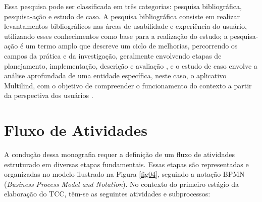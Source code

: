 Essa pesquisa pode ser classificada em três categorias: pesquisa bibliográfica, pesquisa-ação e estudo de caso. A pesquisa bibliográfica consiste em realizar levantamentos bibliográficos nas áreas de usabilidade e experiência do usuário, 
utilizando esses conhecimentos como base para a realização do estudo; a pesquisa-ação é um termo amplo que descreve um ciclo de melhorias, percorrendo os campos da prática e da investigação, geralmente envolvendo etapas de planejamento, 
implementação, descrição e avaliação \cite{tripp2005}, e o estudo de caso envolve a análise aprofundada de uma entidade específica, neste caso, o aplicativo Multilind, com o objetivo de compreender o funcionamento do contexto a partir da perspectiva 
dos usuários \cite{gerhardt2009}.

\section{Fluxo de Atividades}
\label{sec:Fluxo de Atividades}
A condução dessa monografia requer a definição de um fluxo de atividades estruturado em diversas etapas fundamentais. Essas etapas são representadas e organizadas no modelo ilustrado na Figura \ref{fig04}, seguindo a notação BPMN (\textit{Business Process Model and Notation}). 
No contexto do primeiro estágio da elaboração do TCC, têm-se as seguintes atividades e subprocessos:

